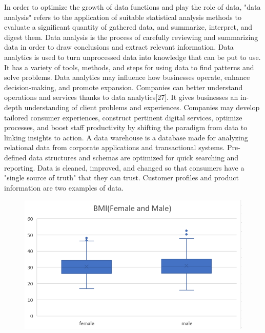 \documentclass[journal]{IEEEtran}
\begin{document}
\par In order to optimize the growth of data functions and play the role of data, "data analysis" refers to the application of suitable statistical analysis methods to evaluate a significant quantity of gathered data, and summarize, interpret, and digest them. Data analysis is the process of carefully reviewing and summarizing data in order to draw conclusions and extract relevant information. Data analytics is used to turn unprocessed data into knowledge that can be put to use. It has a variety of tools, methods, and steps for using data to find patterns and solve problems. Data analytics may influence how businesses operate, enhance decision-making, and promote expansion. Companies can better understand operations and services thanks to data analytics[27]. It gives businesses an in-depth understanding of client problems and experiences. Companies may develop tailored consumer experiences, construct pertinent digital services, optimize processes, and boost staff productivity by shifting the paradigm from data to linking insights to action. A data warehouse is a database made for analyzing relational data from corporate applications and transactional systems. Pre-defined data structures and schemas are optimized for quick searching and reporting. Data is cleaned, improved, and changed so that consumers have a "single source of truth" that they can trust. Customer profiles and product information are two examples of data.

 \begin{figure}[h]
  \centering
  \includegraphics [width= 3.55 in]{8.png}
\caption{}
  \label{storage}
\end{figure}
\end{document}
